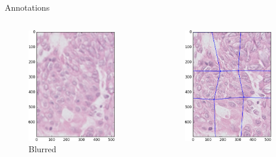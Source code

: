 \documentclass{beamer}
\begin{document}
\begin{frame}{Annotations}
\begin{columns}[T]
\begin{column}{.16\textwidth}
\begin{figure}[!ht]
\includegraphics[width=0.9\textwidth]{blur.png}\par 
\caption{Blurred}
\label{fig: blur}
\end{figure}
\end{column}%
\begin{column}{.16\textwidth}
\begin{figure}[!ht]
\centering
\includegraphics[width=0.9\textwidth]{ELAST.png}\par 

\end{figure}
\end{column}
\end{columns}
\end{frame}
\end{document}

